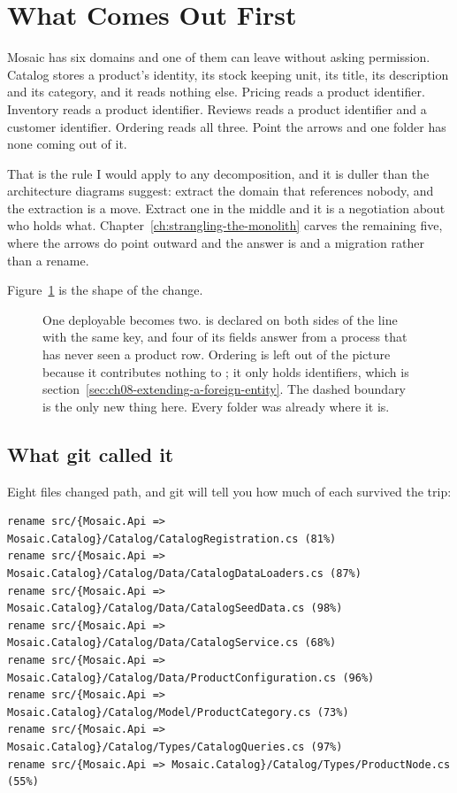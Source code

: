 \section{What Comes Out First}
\label{sec:ch08-what-comes-out-first}
%

Mosaic has six domains and one of them can leave without asking permission.
Catalog stores a product's identity, its stock keeping unit, its title, its
description and its category, and it reads nothing else. Pricing reads a product
identifier. Inventory reads a product identifier. Reviews reads a product
identifier and a customer identifier. Ordering reads all three. Point the arrows
and one folder has none coming out of it.

%
That is the rule I would apply to any decomposition, and it is duller than the
architecture diagrams suggest: extract the domain that references nobody, and
the extraction is a move. Extract one in the middle and it is a negotiation
about who holds what. Chapter~\ref{ch:strangling-the-monolith} carves the
remaining five, where the arrows do point outward and the answer is
 and a migration rather than a rename.

Figure~\ref{fig:ch08-the-cut} is the shape of the change.

\begin{figure}[htbp]
  \centering
  
  \caption{One deployable becomes two.  is declared on both sides
  of the line with the same key, and four of its fields answer from a process
  that has never seen a product row. Ordering is left out of the picture
  because it contributes nothing to ; it only holds identifiers,
  which is section~\ref{sec:ch08-extending-a-foreign-entity}. The dashed boundary is
  the only new thing here. Every folder was already where it is.}
  \label{fig:ch08-the-cut}
\end{figure}

\subsection*{What git called it}

%
Eight files changed path, and git will tell you how much of each survived the
trip:

\begin{verbatim}
rename src/{Mosaic.Api => Mosaic.Catalog}/Catalog/CatalogRegistration.cs (81%)
rename src/{Mosaic.Api => Mosaic.Catalog}/Catalog/Data/CatalogDataLoaders.cs (87%)
rename src/{Mosaic.Api => Mosaic.Catalog}/Catalog/Data/CatalogSeedData.cs (98%)
rename src/{Mosaic.Api => Mosaic.Catalog}/Catalog/Data/CatalogService.cs (68%)
rename src/{Mosaic.Api => Mosaic.Catalog}/Catalog/Data/ProductConfiguration.cs (96%)
rename src/{Mosaic.Api => Mosaic.Catalog}/Catalog/Model/ProductCategory.cs (73%)
rename src/{Mosaic.Api => Mosaic.Catalog}/Catalog/Types/CatalogQueries.cs (97%)
rename src/{Mosaic.Api => Mosaic.Catalog}/Catalog/Types/ProductNode.cs (55%)
\end{verbatim}

